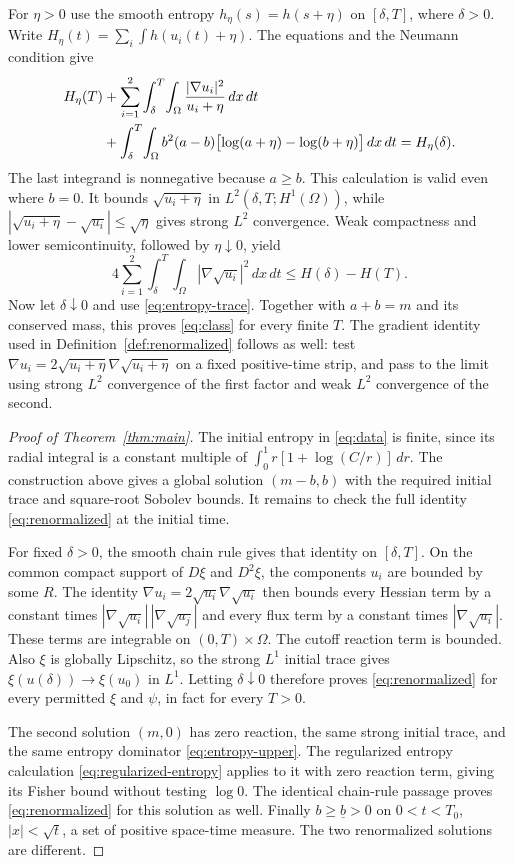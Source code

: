 \documentclass[11pt]{article}
\theoremstyle{definition}
\newcommand{\Om}{\Omega}
\newcommand{\dd}{\,dx}
\newcommand{\dt}{\,dt}
\newcommand{\ub}{\underline b}
\begin{document}
For $\eta>0$ use the smooth entropy $h_\eta(s)=h(s+\eta)$ on
$[\delta,T]$, where $\delta>0$. Write $H_\eta(t)=\sum_i\int h(u_i(t)+\eta)$.
The equations and the Neumann condition give
\begin{align}\label{eq:regularized-entropy}
 H_\eta(T)&+\sum_{i=1}^2\int_\delta^T\!\int_\Om
                      \frac{|\nabla u_i|^2}{u_i+\eta}\dd\dt\notag\\
 &+\int_\delta^T\!\int_\Om b^2(a-b)
              \bigl[\log(a+\eta)-\log(b+\eta)\bigr]\dd\dt
       =H_\eta(\delta).
\end{align}
The last integrand is nonnegative because $a\ge b$. This calculation is
valid even where $b=0$. It bounds $\sqrt{u_i+\eta}$ in
$L^2(\delta,T;H^1(\Om))$, while
$|\sqrt{u_i+\eta}-\sqrt{u_i}|\le\sqrt\eta$ gives strong $L^2$ convergence.
Weak compactness and lower semicontinuity, followed by $\eta\downarrow0$,
yield
\[
 4\sum_{i=1}^2\int_\delta^T\!\int_\Om|\nabla\sqrt{u_i}|^2\dd\dt
       \le H(\delta)-H(T).
\]
Now let $\delta\downarrow0$ and use \eqref{eq:entropy-trace}. Together
with $a+b=m$ and its conserved mass, this proves \eqref{eq:class} for every
finite $T$.
The gradient identity used in Definition~\ref{def:renormalized} follows as
well: test $\nabla u_i=2\sqrt{u_i+\eta}\nabla\sqrt{u_i+\eta}$ on a
fixed positive-time strip, and pass to the limit using strong $L^2$
convergence of the first factor and weak $L^2$ convergence of the second.


\begin{proof}[Proof of Theorem~\ref{thm:main}]
The initial entropy in \eqref{eq:data} is finite, since its radial integral
is a constant multiple of $\int_0^1 r[1+\log(C/r)]\,dr$.
The construction above gives a global solution $(m-b,b)$ with the required
initial trace and square-root Sobolev bounds. It remains to check the full
identity \eqref{eq:renormalized} at the initial time.

For fixed $\delta>0$, the smooth chain rule gives that identity on
$[\delta,T]$. On the common compact support of $D\xi$ and $D^2\xi$, the
components $u_i$ are bounded by some $R$. The identity
$\nabla u_i=2\sqrt{u_i}\nabla\sqrt{u_i}$ then bounds every Hessian term by
a constant times
$|\nabla\sqrt{u_i}|\,|\nabla\sqrt{u_j}|$ and every flux term by a constant
times $|\nabla\sqrt{u_i}|$. These terms are integrable on $(0,T)\times\Om$.
The cutoff reaction term is bounded. Also $\xi$ is globally Lipschitz, so
the strong $L^1$ initial trace gives $\xi(u(\delta))\to\xi(u_0)$ in $L^1$.
Letting $\delta\downarrow0$ therefore proves \eqref{eq:renormalized} for
every permitted $\xi$ and $\psi$, in fact for every $T>0$.

The second solution $(m,0)$ has zero reaction, the same strong initial
trace, and the same entropy dominator \eqref{eq:entropy-upper}. The
regularized entropy calculation \eqref{eq:regularized-entropy} applies to
it with zero reaction term, giving its Fisher bound without testing
$\log0$. The identical chain-rule passage proves
\eqref{eq:renormalized} for this solution as well.
Finally $b\ge\ub>0$ on $0<t<T_0$, $|x|<\sqrt t$, a set of positive
space-time measure. The two renormalized solutions are different.
\end{proof}
\end{document}
